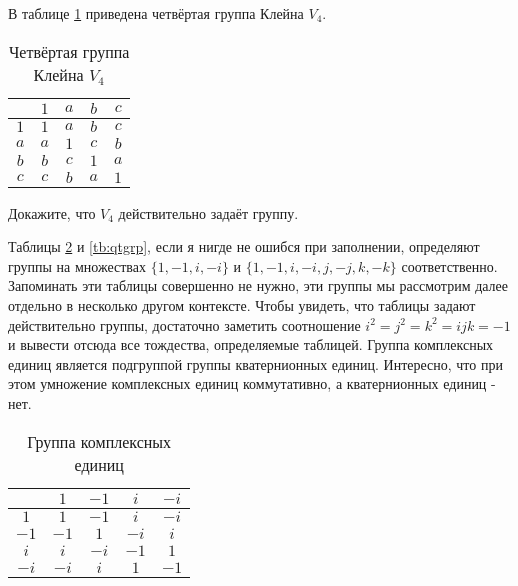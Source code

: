 \begin{example}
	В таблице \ref{tb:v4} приведена четвёртая группа Клейна $V_4$.
\end{example}

\begin{table}[h]
	\centering
	\begin{tabular}{c|cccc}
		& $1$ & $a$ & $b$ & $c$ \\ 
		\hline $1$ & $1$ & $a$ & $b$ & $c$ \\ 
		$a$ & $a$ & $1$ & $c$ & $b$ \\ 
		$b$ & $b$ & $c$ & $1$ & $a$ \\ 
		$c$ & $c$ & $b$ & $a$ & $1$ \\ 
	\end{tabular}
	\caption{Четвёртая группа Клейна $V_4$}\label{tb:v4}
\end{table}

\begin{exercise}
	Докажите, что $V_4$ действительно задаёт группу.
\end{exercise}

\begin{example}
	Таблицы \ref{tb:cmplxgrp} и \ref{tb:qtgrp}, если я нигде не ошибся при заполнении, определяют группы на множествах $\{1, -1, i, -i\}$ и $\{1, -1, i, -i, j, -j, k, -k\}$ соответственно. Запоминать эти таблицы совершенно не нужно, эти группы мы рассмотрим далее отдельно в несколько другом контексте. Чтобы увидеть, что таблицы задают действительно группы, достаточно заметить соотношение $i^2 = j^2 = k^2 = ijk = -1$ и вывести отсюда все тождества, определяемые таблицей. Группа комплексных единиц является подгруппой группы кватернионных единиц. Интересно, что при этом умножение комплексных единиц коммутативно, а кватернионных единиц - нет.
\end{example}

\begin{table}[h]
	\centering
	\begin{tabular}{c|cccc}
		& $1$ & $-1$ & $i$ & $-i$ \\ 
		\hline $1$ & $1$ & $-1$ & $i$ & $-i$ \\ 
		$-1$ & $-1$ & $1$ & $-i$ & $i$ \\ 
		$i$ & $i$ & $-i$ & $-1$ & $1$ \\ 
		$-i$ & $-i$ & $i$ & $1$ & $-1$ \\ 
	\end{tabular} 
	\caption{Группа комплексных единиц}\label{tb:cmplxgrp}
\end{table}

